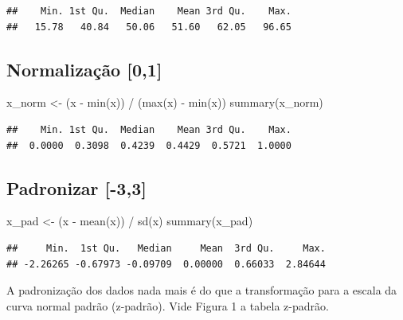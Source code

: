 \documentclass[
]{article}
\newenvironment{Shaded}{\begin{snugshade}}{\end{snugshade}}
\newcommand{\FunctionTok}[1]{\textcolor[rgb]{0.00,0.00,0.00}{#1}}
\newcommand{\NormalTok}[1]{#1}
\newcommand{\OtherTok}[1]{\textcolor[rgb]{0.56,0.35,0.01}{#1}}
\newcommand{\SpecialCharTok}[1]{\textcolor[rgb]{0.00,0.00,0.00}{#1}}
\begin{document}
\begin{verbatim}
##    Min. 1st Qu.  Median    Mean 3rd Qu.    Max. 
##   15.78   40.84   50.06   51.60   62.05   96.65
\end{verbatim}

\hypertarget{normalizauxe7uxe3o-01}{%
\subsection{Normalização {[}0,1{]}}\label{normalizauxe7uxe3o-01}}

\begin{Shaded}
\begin{Highlighting}[]
\NormalTok{x\_norm }\OtherTok{\textless{}{-}}\NormalTok{ (x }\SpecialCharTok{{-}} \FunctionTok{min}\NormalTok{(x)) }\SpecialCharTok{/}\NormalTok{ (}\FunctionTok{max}\NormalTok{(x) }\SpecialCharTok{{-}} \FunctionTok{min}\NormalTok{(x))}
\FunctionTok{summary}\NormalTok{(x\_norm)}
\end{Highlighting}
\end{Shaded}

\begin{verbatim}
##    Min. 1st Qu.  Median    Mean 3rd Qu.    Max. 
##  0.0000  0.3098  0.4239  0.4429  0.5721  1.0000
\end{verbatim}

\hypertarget{padronizar--33}{%
\subsection{Padronizar {[}-3,3{]}}\label{padronizar--33}}

\begin{Shaded}
\begin{Highlighting}[]
\NormalTok{x\_pad }\OtherTok{\textless{}{-}}\NormalTok{ (x }\SpecialCharTok{{-}} \FunctionTok{mean}\NormalTok{(x)) }\SpecialCharTok{/} \FunctionTok{sd}\NormalTok{(x)}
\FunctionTok{summary}\NormalTok{(x\_pad)}
\end{Highlighting}
\end{Shaded}

\begin{verbatim}
##     Min.  1st Qu.   Median     Mean  3rd Qu.     Max. 
## -2.26265 -0.67973 -0.09709  0.00000  0.66033  2.84644
\end{verbatim}

A padronização dos dados nada mais é do que a transformação para a
escala da curva normal padrão (z-padrão). Vide Figura 1 a tabela
z-padrão.
\end{document}
